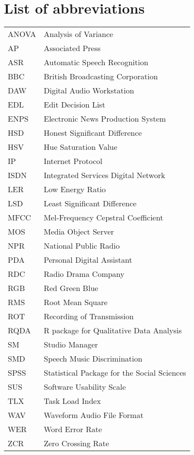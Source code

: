 \chapter*{List of abbreviations}

\begin{tabular}{l l}
ANOVA & Analysis of Variance \\
AP & Associated Press \\
ASR & Automatic Speech Recognition \\
BBC & British Broadcasting Corporation \\
DAW & Digital Audio Workstation \\
EDL & Edit Decision List \\
ENPS & Electronic News Production System \\
HSD & Honest Significant Difference \\
HSV & Hue Saturation Value \\
IP & Internet Protocol \\
ISDN & Integrated Services Digital Network \\
LER & Low Energy Ratio \\
LSD & Least Significant Difference \\
MFCC & Mel-Frequency Cepstral Coefficient \\
MOS & Media Object Server \\
NPR & National Public Radio \\
PDA & Personal Digital Assistant \\
RDC & Radio Drama Company \\
RGB & Red Green Blue \\
RMS & Root Mean Square \\
ROT & Recording of Transmission \\
RQDA & R package for Qualitative Data Analysis \\
SM  & Studio Manager \\
SMD & Speech Music Discrimination \\
SPSS & Statistical Package for the Social Sciences \\
SUS & Software Usability Scale \\
TLX & Task Load Index \\
WAV & Waveform Audio File Format \\
WER & Word Error Rate \\
ZCR & Zero Crossing Rate
\end{tabular}
